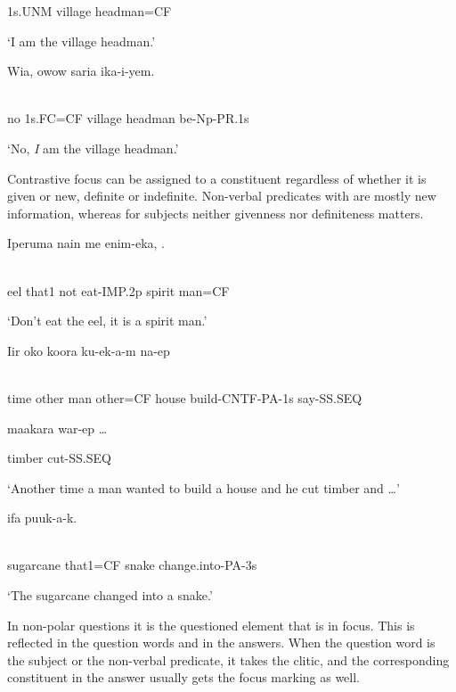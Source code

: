 1s.UNM  village  headman=CF

`I am the village headman.'

\ea%
\label{ex:x1708}
\gll Wia,    owow  saria  ika-i-yem. \\
      \\
\glt
\z

no  1s.FC=CF  village  headman  be-Np-PR.1s

`No, \textit{I} am the village headman.'

Contrastive focus can be assigned to a constituent regardless of whether it is given or new, definite or indefinite. Non-verbal predicates with  are mostly new information, whereas for subjects neither givenness nor definiteness matters.

\ea%
\label{ex:x1709}
\gll Iperuma  nain  me  enim-eka,  . \\
      \\
\glt
\z

eel  that1  not  eat-IMP.2p  spirit  man=CF

`Don't eat the eel, it is a spirit man.'

\ea%
\label{ex:x1710}
\gll Iir  oko    koora  ku-ek-a-m  na-ep \\
      \\
\glt
\z

time  other  man  other=CF  house  build-CNTF-PA-1s  say-SS.SEQ

maakara  war-ep  {\dots}

timber  cut-SS.SEQ

`Another time a man wanted to build a house and he cut timber and {\dots}'

\ea%
\label{ex:x1711}
\gll {}    ifa  puuk-a-k. \\
      \\
\glt
\z

sugarcane  that1=CF  snake  change.into-PA-3s

`The sugarcane changed into a snake.'

In non-polar questions it is the questioned element that is in focus. This is reflected in the question words and in the answers. When the question word is the subject or the non-verbal predicate, it takes the  clitic, and the corresponding constituent in the answer usually gets the focus marking as well.

